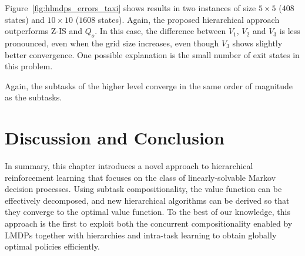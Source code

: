 Figure~\ref{fig:hlmdps_errors_taxi} shows results in two instances of size $5 \times 5$ ($408$ states) and $10 \times 10$ ($1608$ states). %
Again, the proposed hierarchical approach outperforms Z-IS and $Q_o$.
In this case, the difference between $V_1$, $V_2$ and $V_3$ is less pronounced, even when the grid size increases, even though $V_3$ shows slightly better convergence. One possible explanation is the small number of exit states in this problem.

Again, the subtasks of the higher level converge in the same order of magnitude as the subtasks.



\section{Discussion and Conclusion}

In summary, this chapter introduces a novel approach to hierarchical reinforcement learning that focuses on the class of linearly-solvable Markov decision processes.
Using subtask compositionality, the value function can be effectively decomposed, and new hierarchical algorithms can be derived so that they converge to the optimal value function.
To the best of our knowledge, this approach is the first to exploit both the concurrent compositionality enabled by LMDPs together with hierarchies and intra-task learning to obtain globally optimal policies efficiently.


